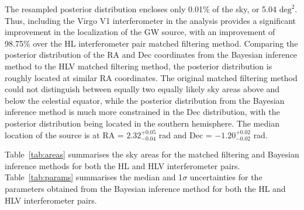 \documentclass[11pt,a4paper]{article}
\begin{document}
The resampled posterior distribution encloses only 0.01\% of the sky, or 5.04 $\mathrm{deg}^2$. Thus, including the Virgo V1 interferometer in the analysis provides a significant improvement in the localization of the GW source, with an improvement of 98.75\% over the HL interferometer pair matched filtering method. Comparing the posterior distribution of the RA and Dec coordinates from the Bayesian inference method to the HLV matched filtering method, the posterior distribution is roughly located at similar RA coordinates. The original matched filtering method could not distinguish between equally two equally likely sky areas above and below the celestial equator, while the posterior distribution from the Bayesian inference method is much more constrained in the Dec distribution, with the posterior distribution being located in the southern hemisphere. The median location of the source is at RA = $2.32^{+0.05}_{-0.04}$ rad and Dec = $-1.20^{+0.02}_{-0.02}$ rad.

Table~\ref{tab:areas} summarises the sky areas for the matched filtering and Bayesian inference methods for both the HL and HLV interferometer pairs. Table~\ref{tab:params} summarises the median and 1$\sigma$ uncertainties for the parameters obtained from the Bayesian inference method for both the HL and HLV interferometer pairs.
\end{document}
